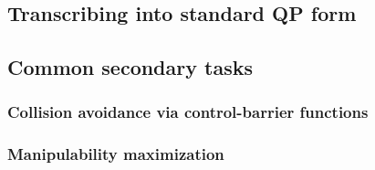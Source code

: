 \documentclass{article}
\begin{document}
\subsection{Transcribing into standard QP form}



\subsection{Common secondary tasks}
\subsubsection{Collision avoidance via control-barrier functions}
\subsubsection{Manipulability maximization}
\end{document}
